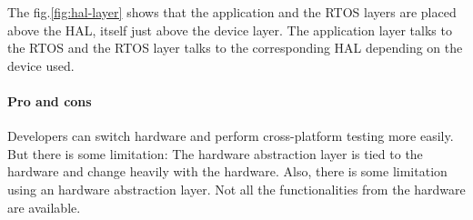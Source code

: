The fig.\ref{fig:hal-layer} shows that the application and the RTOS layers are placed above the HAL, itself just above the device layer.
The application layer talks to the RTOS and the RTOS layer talks to the corresponding HAL depending on the device used.


\paragraph{Pro and cons}
Developers can switch hardware and perform cross-platform testing more easily.
But there is some limitation: The hardware abstraction layer is tied to the hardware and change heavily with the hardware.
Also, there is some limitation using an hardware abstraction layer.
Not all the functionalities from the hardware are available.